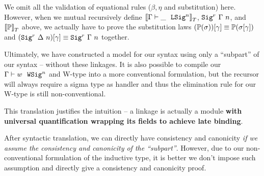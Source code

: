 We omit all the validation of equational rules ($\beta,\eta$ and substitution) here.
However, when we mutual recursively define
${{\llbracket {\ensuremath{ {\Gamma} \vdash {\_} \ \ \texttt{LSig}^{n} }} \rrbracket}_T}$, ${{ \texttt{Sig}^r_{}~{\Gamma}~{n} }} $, and
${{\llbracket {\ensuremath{\mathbb{P}}} \rrbracket}_T}$ above, we actually have to prove the substitution laws
${(\mathbb{P}({\sigma}))}\!\left[{\gamma}\right]\equiv \mathbb{P}({{\sigma}\!\left[{\gamma}\right]})$ and ${({ \texttt{Sig}^r_{}~{\Delta}~{n} })}\!\left[{\gamma}\right]
\equiv {\ensuremath{ \texttt{Sig}^r_{}~{\Gamma}~{n} }}$ together. 


Ultimately, we have constructed a model for our syntax using only a
``subpart'' of our syntax -- without these linkages. It is also
possible to compile our $ {\Gamma} \vdash {w} \ \ \texttt{WSig}^{n} $ and W-type into a more
conventional formulation, but the recursor will always require a sigma
type as handler and thus the elimination rule for our W-type is still
non-conventional.

This translation justifies the intuition -- a linkage is actually a
module \textbf{with universal quantification wrapping its fields to
achieve late binding}. 

After syntactic translation, we can directly have consistency and
canonicity \textit{if we assume the consistency and canonicity of the
``subpart''}. However, due to our non-conventional formulation of the
inductive type, it is better we don't impose such assumption and
directly give a consistency and canonicity proof.


